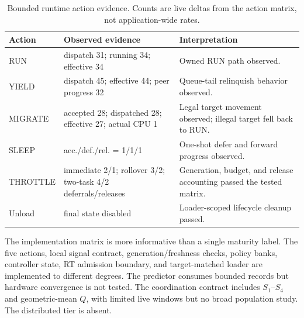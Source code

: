 \documentclass[10pt,letterpaper,twocolumn]{article}
\begin{document}
\begin{table}[t]
\centering\scriptsize
\caption{Bounded runtime action evidence. Counts are live deltas from the action matrix, not application-wide rates.}
\label{tab:actions}
\begin{tabular}{p{}p{}p{}}
\toprule
Action & Observed evidence & Interpretation \\
\midrule
RUN & dispatch 31; running 34; effective 34 & Owned RUN path observed. \\
YIELD & dispatch 45; effective 44; peer progress 32 & Queue-tail relinquish behavior observed. \\
MIGRATE & accepted 28; dispatched 28; effective 27; actual CPU 1 & Legal target movement observed; illegal target fell back to RUN. \\
SLEEP & acc./def./rel. = 1/1/1 & One-shot defer and forward progress observed. \\
THROTTLE & immediate 2/1; rollover 3/2; two-task 4/2 deferrals/releases & Generation, budget, and release accounting passed the tested matrix. \\
Unload & final state disabled & Loader-scoped lifecycle cleanup passed. \\
\bottomrule
\end{tabular}
\end{table}

The implementation matrix is more informative than a single maturity label. The five actions, local signal contract, generation/freshness checks, policy banks, controller state, RT admission boundary, and target-matched loader are implemented to different degrees. The predictor consumes bounded records but hardware convergence is not tested. The coordination contract includes $S_1$--$S_4$ and geometric-mean $Q$, with limited live windows but no broad population study. The distributed tier is absent.
\end{document}
